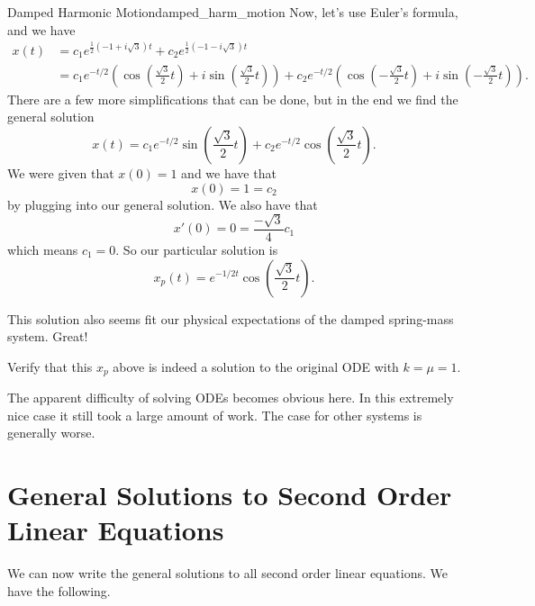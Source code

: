 \begin{ex}{Damped Harmonic Motion}{damped_harm_motion}
        Now, let's use Euler's formula, and we have
        \begin{align*}
            x(t) &= c_1 e^{\frac{1}{2}(-1+i\sqrt{3})t}+c_2 e^{\frac{1}{2}(-1-i\sqrt{3})t}\\
            &= c_1 e^{-t/2}\left(\cos\left(\frac{\sqrt{3}}{2}t\right)+i\sin\left(\frac{\sqrt{3}}{2}t\right)\right)+c_2 e^{-t/2}\left(\cos\left(-\frac{\sqrt{3}}{2}t\right)+i\sin\left(-\frac{\sqrt{3}}{2}t\right)\right).
        \end{align*}
        There are a few more simplifications that can be done, but in the end we find the general solution
        \[
        x(t) = c_1 e^{-t/2} \sin\left(\frac{\sqrt{3}}{2}t\right)+c_2e^{-t/2}\cos\left(\frac{\sqrt{3}}{2}t\right).
        \]
        We were given that $x(0)=1$ and we have that
        \[
        x(0)=1=c_2
        \]
        by plugging into our general solution.  We also have that
        \[
        x'(0)=0=\frac{-\sqrt{3}}{4}c_1
        \]
        which means $c_1=0$.  So our particular solution is
        \[
        x_p(t) = e^{-1/2t}\cos \left(\frac{\sqrt{3}}{2}t\right).
        \]
        
        This solution also seems fit our physical expectations of the damped spring-mass system.  Great!
        \end{ex}
        
        \begin{exercise}
        Verify that this $x_p$ above is indeed a solution to the original ODE with $k=\mu=1$.
        \end{exercise}

        \begin{remark}
        The apparent difficulty of solving ODEs becomes obvious here.  In this extremely nice case it still took a large amount of work.  The case for other systems is generally worse.
        \end{remark}
        
        \section{General Solutions to Second Order Linear Equations}
        
        We can now write the general solutions to all second order linear equations.  We have the following.
        
